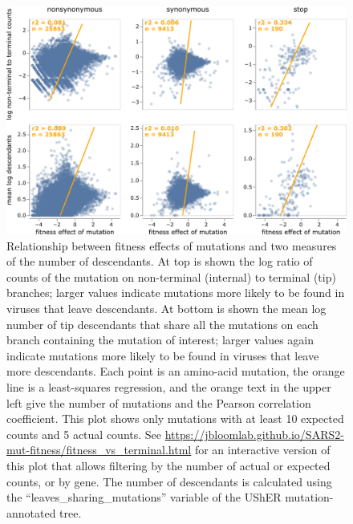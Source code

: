 \documentclass[9pt,twocolumn,twoside]{gsajnl_modified}
\begin{document}
\begin{figure}
\centering
\includegraphics[width=0.75\linewidth]{figs/terminal.png}
\caption{
Relationship between fitness effects of mutations and two measures of the number of descendants.
At top is shown the log ratio of counts of the mutation on non-terminal (internal) to terminal (tip) branches; larger values indicate mutations more likely to be found in viruses that leave descendants.
At bottom is shown the mean log number of tip descendants that share all the mutations on each branch containing the mutation of interest; larger values again indicate mutations more likely to be found in viruses that leave more descendants.
Each point is an amino-acid mutation, the orange line is a least-squares regression, and the orange text in the upper left give the number of mutations and the Pearson correlation coefficient.
This plot shows only mutations with at least 10 expected counts and 5 actual counts.
See \url{https://jbloomlab.github.io/SARS2-mut-fitness/fitness_vs_terminal.html} for an interactive version of this plot that allows filtering by the number of actual or expected counts, or by gene.
The number of descendants is calculated using the ``leaves\_sharing\_mutations'' variable of the UShER mutation-annotated tree.
\label{fig:terminal}
}
\end{figure}
\end{document}

